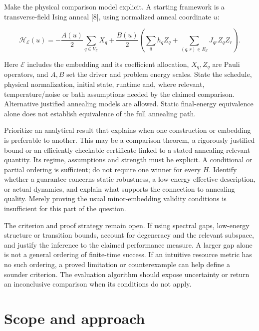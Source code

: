 \documentclass[11pt,letterpaper]{article}
\begin{document}
Make the physical comparison model explicit. A starting framework is a transverse-field Ising anneal [8], using normalized anneal coordinate $u$:\par

\[\mathcal H_{\mathcal E}(u)=-\frac{A(u)}{2}\sum_{q\in V_{\mathcal E}}X_q+\frac{B(u)}{2}\left(\sum_q h_q Z_q+\sum_{(q,r)\in E_{\mathcal E}}J_{qr}Z_qZ_r\right).\]

Here $\mathcal E$ includes the embedding and its coefficient allocation, $X_q,Z_q$ are Pauli operators, and $A,B$ set the driver and problem energy scales. State the schedule, physical normalization, initial state, runtime and, where relevant, temperature/noise or bath assumptions needed by the claimed comparison. Alternative justified annealing models are allowed. Static final-energy equivalence alone does not establish equivalence of the full annealing path.\par

Prioritize an analytical result that explains when one construction or embedding is preferable to another. This may be a comparison theorem, a rigorously justified bound or an efficiently checkable certificate linked to a stated annealing-relevant quantity. Its regime, assumptions and strength must be explicit. A conditional or partial ordering is sufficient; do not require one winner for every $H$. Identify whether a guarantee concerns static robustness, a low-energy effective description, or actual dynamics, and explain what supports the connection to annealing quality. Merely proving the usual minor-embedding validity conditions is insufficient for this part of the question.\par

The criterion and proof strategy remain open. If using spectral gaps, low-energy structure or transition bounds, account for degeneracy and the relevant subspace, and justify the inference to the claimed performance measure. A larger gap alone is not a general ordering of finite-time success. If an intuitive resource metric has no such ordering, a proved limitation or counterexample can help define a sounder criterion. The evaluation algorithm should expose uncertainty or return an inconclusive comparison when its conditions do not apply.\par

\section{Scope and approach}
\end{document}
